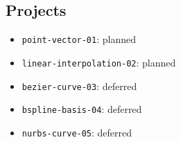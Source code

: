 \subsection{Projects}

\begin{itemize}
  \item \texttt{point-vector-01}: planned
  \item \texttt{linear-interpolation-02}: planned
  \item \texttt{bezier-curve-03}: deferred
  \item \texttt{bspline-basis-04}: deferred
  \item \texttt{nurbs-curve-05}: deferred
\end{itemize}
